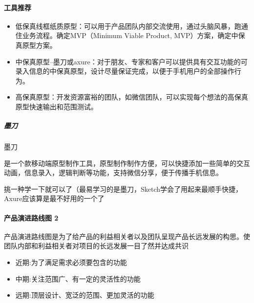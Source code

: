 \documentclass[letterpaper,11pt,english]{sphinxmanual}
\begin{document}
\paragraph{工具推荐}
\label{\detokenize{chapter_knowledge/prototype_design:id13}}\begin{itemize}
\item {} 
低保真\sphinxhyphen{}线框\sphinxhyphen{}纸质原型：可以用于产品团队内部交流使用，通过头脑风暴，跑通住业务流程。确定MVP（Minimum
Viable Product, MVP）方案，确定中保真原型方案。

\item {} 
中保真原型–墨刀或axure：对于朋友、专家和客户可以提供具有交互功能的可录入信息的中保真原型，设计尽量保证完成，以便于手机用户的全部操作行为。

\item {} 
高保真原型：开发资源富裕的团队，如微信团队，可以实现每个想法的高保真原型快速输出和范围测试。

\end{itemize}


\subparagraph{墨刀}
\label{\detokenize{chapter_knowledge/prototype_design:id14}}
墨刀%
\begin{footnote}[535]\sphinxAtStartFootnote
{}
%
\end{footnote}是一个款移动端原型制作工具，原型制作制作方便，可以快捷添加一些简单的交互动画，信息录入，逻辑判断等功能，支持微信分享，便于传播手机信息。

挑一种学一下就可以了（最易学习的是墨刀，Sketch学会了用起来最顺手快捷，Axure应该算是最不好用的一个了


\paragraph{产品演进路线图 2\sphinxfootnotemark[536]}
\label{\detokenize{chapter_knowledge/prototype_design:id15}}%
\begin{footnotetext}[536]\sphinxAtStartFootnote
{}
%
\end{footnotetext}\ignorespaces 
产品演进路线图是为了给产品的利益相关者以及团队呈现产品长远发展的构思。使团队内部和利益相关者对项目的长远发展一目了然并达成共识
\begin{itemize}
\item {} 
近期:为了满足需求必须要包含的功能

\item {} 
中期:关注范围广、有一定的灵活性的功能

\item {} 
远期:顶层设计、宽泛的范围、更加灵活的功能

\end{itemize}
\end{document}
